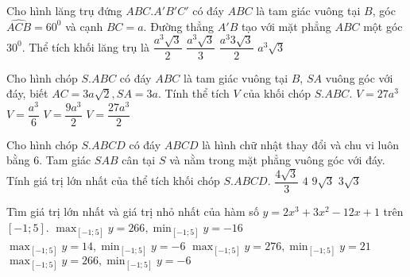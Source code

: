 \begin{ex}%
Cho hình lăng trụ đứng $ABC.A'B'C'$ có đáy $ABC$ là tam giác vuông tại $B$, góc $\widehat{ACB}=60^0$ và cạnh $BC=a$. Đường thẳng $A'B$ tạo với mặt phẳng $ABC$ một góc $30^0$. Thể tích khối lăng trụ là
\choice
{\True $\dfrac{a^3\sqrt{3}}{2}$}
{$\dfrac{a^3\sqrt{3}}{3}$}
{$\dfrac{a^3 3\sqrt{3}}{2}$}
{ $a^3\sqrt{3}$}
\end{ex}
\begin{ex}%
Cho hình chóp $S.ABC$ có đáy $ABC$ là tam giác vuông tại $B$,  $SA$ vuông góc với đáy, biết $AC=3a\sqrt{2}, SA=3a$. Tính thể tích $V$ của khối chóp $S.ABC$.
\choice
{ $V=27a^3$}
{$V=\dfrac{a^3}{6}$}
{\True  $V=\dfrac{9a^3 }{2}$}
{ $V=\dfrac{27a^3 }{2}$}
\end{ex}
\begin{ex}%
Cho hình chóp $S.ABCD$ có đáy $ABCD$ là hình chữ nhật thay đổi và chu vi luôn bằng 6. Tam giác  $SAB$ cân tại $S$ và nằm trong mặt phẳng vuông góc với đáy. Tính giá trị lớn nhất của thể tích khối chóp $S.ABCD$.
\choice
{ \True  $\dfrac{4\sqrt{3}}{3}$}
{$4$}
{ $9\sqrt{3}$}
{ $3\sqrt{3}$}
\end{ex}
\begin{ex}%
Tìm giá trị lớn nhất và giá trị nhỏ nhất của hàm số $y=2x^3+3x^2-12x+1$ trên $[-1;5]$.
\choice
{ $
\displaystyle \max_{[-1;5]}y=266, \min_{[-1;5]}y=-16
$}
{$\displaystyle \max_{[-1;5]}y=14, \min_{[-1;5]}y=-6$}
{ $\displaystyle \max_{[-1;5]}y=276, \min_{[-1;5]}y=21$}
{ \True  $\displaystyle \max_{[-1;5]}y=266, \min_{[-1;5]}y=-6$}
\end{ex}
\begin{ex}%
{
}
\end{ex} 
